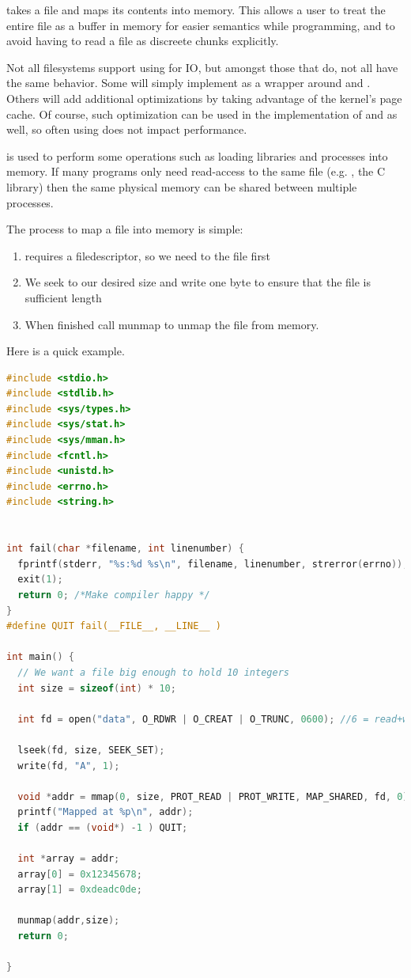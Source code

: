  takes a file and maps its contents into memory. This allows a user to treat the entire file as a buffer in memory for easier semantics while programming, and to avoid having to read a file as discreete chunks explicitly.

Not all filesystems support using  for IO, but amongst those that do, not all have the same behavior. Some will simply implement  as a wrapper around  and . Others will add additional optimizations by taking advantage of the kernel's page cache. Of course, such optimization can be used in the implementation of  and  as well, so often using  does not impact performance.

 is used to perform some operations such as loading libraries and processes into memory. If many programs only need read-access to the same file (e.g. , the C library) then the same physical memory can be shared between multiple processes.

The process to map a file into memory is simple:

\begin{enumerate}
\item {} requires a filedescriptor, so we need to  the file first
\item We seek to our desired size and write one byte to ensure that the file is sufficient length
\item When finished call munmap to unmap the file from memory.
\end{enumerate}

Here is a quick example.

\begin{lstlisting}[language=C]
#include <stdio.h>
#include <stdlib.h>
#include <sys/types.h>
#include <sys/stat.h>
#include <sys/mman.h>
#include <fcntl.h>
#include <unistd.h>
#include <errno.h>
#include <string.h>


int fail(char *filename, int linenumber) {
  fprintf(stderr, "%s:%d %s\n", filename, linenumber, strerror(errno));
  exit(1);
  return 0; /*Make compiler happy */
}
#define QUIT fail(__FILE__, __LINE__ )

int main() {
  // We want a file big enough to hold 10 integers
  int size = sizeof(int) * 10;

  int fd = open("data", O_RDWR | O_CREAT | O_TRUNC, 0600); //6 = read+write for me!

  lseek(fd, size, SEEK_SET);
  write(fd, "A", 1);

  void *addr = mmap(0, size, PROT_READ | PROT_WRITE, MAP_SHARED, fd, 0);
  printf("Mapped at %p\n", addr);
  if (addr == (void*) -1 ) QUIT;

  int *array = addr;
  array[0] = 0x12345678;
  array[1] = 0xdeadc0de;

  munmap(addr,size);
  return 0;

}
\end{lstlisting}

